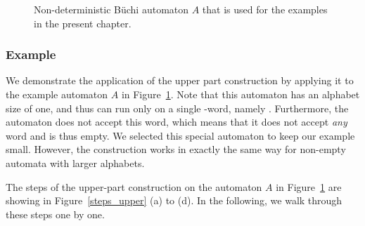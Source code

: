 \begin{figure}[htb]
\centering
\Automaton
\caption{Non-deterministic Büchi automaton $A$ that is used for the examples in the present chapter.}
\label{ex_aut_2}
\end{figure}





\subsubsection{Example}
We demonstrate the application of the upper part construction by applying it to the example automaton $A$ in Figure~\ref{ex_aut_2}. Note that this automaton has an alphabet size of one, and thus can run only on a single \om-word, namely \aom. Furthermore, the automaton does not accept this word, which means that it does not accept \textit{any} word and is thus empty. We selected this special  automaton to keep our example small. However, the construction works in exactly the same way for non-empty automata with larger alphabets.

The steps of the upper-part construction on the automaton $A$ in Figure~\ref{ex_aut_2} are showing in Figure~\ref{steps_upper} (a) to (d). In the following, we walk through these steps one by one.

